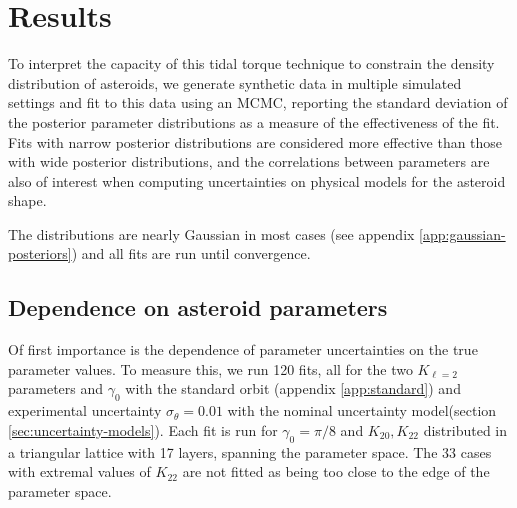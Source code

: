 \documentclass{aastex631}
\begin{document}
\section{Results}
To interpret the capacity of this tidal torque technique to constrain the density distribution of asteroids, we generate synthetic data in multiple simulated settings and fit to this data using an MCMC, reporting the standard deviation of the posterior parameter distributions as a measure of the effectiveness of the fit. Fits with narrow posterior distributions are considered more effective than those with wide posterior distributions, and the correlations between parameters are also of interest when computing uncertainties on physical models for the asteroid shape.

The distributions are nearly Gaussian in most cases (see appendix \ref{app:gaussian-posteriors}) and all fits are run until convergence.

\subsection{Dependence on asteroid parameters}
\label{sec:probe-space}
Of first importance is the dependence of parameter uncertainties on the true parameter values. To measure this, we run 120 fits, all for the two $K_{\ell = 2}$ parameters and $\gamma_0$ with the standard orbit (appendix \ref{app:standard}) and experimental uncertainty $\sigma_\theta = 0.01$ with the nominal uncertainty model(section \ref{sec:uncertainty-models}). Each fit is run for $\gamma_0=\pi/8$ and $K_{20}, K_{22}$ distributed in a triangular lattice with 17 layers, spanning the parameter space. The 33 cases with extremal values of $K_{22}$ are not fitted as being too close to the edge of the parameter space.
\end{document}
